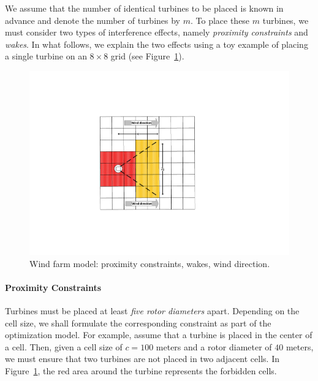 \documentclass[preprint,12pt]{elsarticle}
\begin{document}
We assume that the number of identical turbines to be placed is known 
in advance and denote the number of turbines by $m$. To place these $m$ turbines, 
we must consider two types of interference effects, namely \emph{proximity constraints} and \emph{wakes}.
In what follows, we explain the two effects using a toy example of placing a single turbine on an 
$8\times8$ grid (see Figure~\ref{fig:field_model}).

\begin{figure}[t]
	\centering
	\includegraphics[scale = 0.9]{field_model.pdf}

	\caption{Wind farm model: proximity constraints, wakes, wind direction.}\label{fig:field_model}
\end{figure}



\paragraph{Proximity Constraints}
Turbines must be placed at least \emph{five rotor diameters}
apart. Depending on the cell size, we shall formulate the
corresponding constraint as part of the optimization model. For
example, assume that a turbine is placed in the center of a
cell. Then, given a cell size of $c = 100$ meters and a rotor diameter
of $40$ meters, we must ensure that two turbines are not placed in
two adjacent cells. In Figure~\ref{fig:field_model}, the red area
around the turbine represents the forbidden cells.
	 
\end{document}
